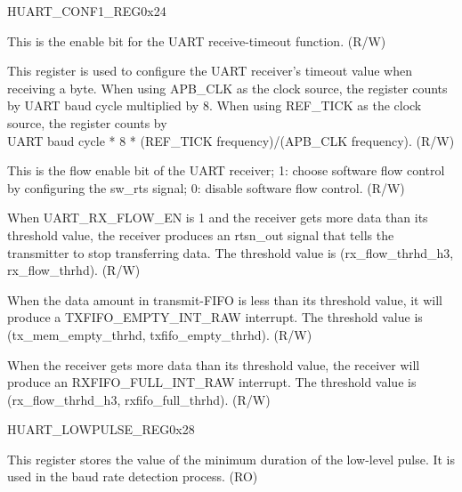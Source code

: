 \begin{register}{H}{UART\_CONF1\_REG}{0x24}\label{regdesc:UARTCONF1REG}
%
%
%
%
%
%
%
%
\regnewline%
\begin{regdesc}\begin{reglist}
\item [UART\_RX\_TOUT\_EN]This is the enable bit for the UART receive-timeout function. (R/W)
\item [UART\_RX\_TOUT\_THRHD]\label{UARTRXTOUTTHRHD} This register is used to configure the UART receiver's timeout value when receiving a byte. When using APB\_CLK as the clock source, the register counts by UART baud cycle multiplied by 8. When using REF\_TICK as the clock source, the register counts by\\ UART baud cycle * 8 * (REF\_TICK frequency)/(APB\_CLK frequency). (R/W)
\item [UART\_RX\_FLOW\_EN]This is the flow enable bit of the UART receiver; 1: choose software flow control by configuring the sw\_rts signal; 0: disable software flow control. (R/W)
\item [UART\_RX\_FLOW\_THRHD]When UART\_RX\_FLOW\_EN is 1 and the receiver gets more data than its threshold value, the receiver produces an rtsn\_out signal that tells the transmitter to stop transferring data. The threshold value is (rx\_flow\_thrhd\_h3, rx\_flow\_thrhd). (R/W)
\item [UART\_TXFIFO\_EMPTY\_THRHD]\label{UARTTXFIFOEMPTYTHRHD}When the data amount in transmit-FIFO is less than its threshold value, it will produce a TXFIFO\_EMPTY\_INT\_RAW interrupt. The threshold value is (tx\_mem\_empty\_thrhd, txfifo\_empty\_thrhd). (R/W)
\item [UART\_RXFIFO\_FULL\_THRHD]\label{UARTRXFIFOFULLTHRHD} When the receiver gets more data than its threshold value, the receiver will produce an RXFIFO\_FULL\_INT\_RAW interrupt. The threshold value is (rx\_flow\_thrhd\_h3, rxfifo\_full\_thrhd). (R/W)
\end{reglist}\end{regdesc}
\end{register}


\begin{register}{H}{UART\_LOWPULSE\_REG}{0x28}\label{regdesc:UARTLOWPULSEREG}
%
%
\regnewline%
\begin{regdesc}\begin{reglist}
\item [UART\_LOWPULSE\_MIN\_CNT]This register stores the value of the minimum duration of the low-level pulse. It is used in the baud rate detection process. (RO)
\end{reglist}\end{regdesc}
\end{register}


